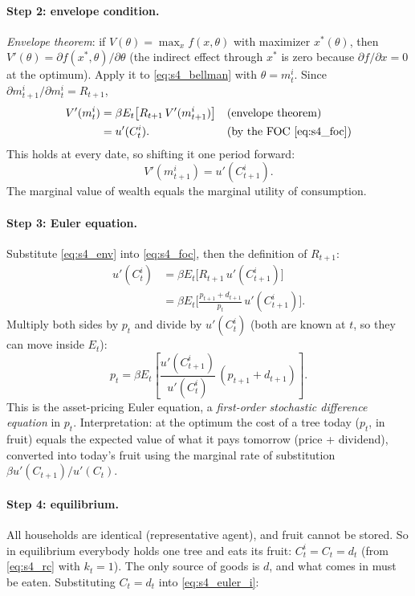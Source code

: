 \paragraph{Step 2: envelope condition.}
\emph{Envelope theorem}: if $V(\theta)=\max_x f(x,\theta)$ with maximizer $x^*(\theta)$, then $V'(\theta) = \partial f(x^*,\theta)/\partial\theta$ (the indirect effect through $x^*$ is zero because $\partial f/\partial x=0$ at the optimum).
Apply it to \eqref{eq:s4_bellman} with $\theta = m^i_t$. Since $\partial m^i_{t+1}/\partial m^i_t = R_{t+1}$,
\begin{align*}
  V'(m^i_t) &= \beta E_t\big[R_{t+1}\,V'(m^i_{t+1})\big] && \text{(envelope theorem)}\\
            &= u'(C^i_t). && \text{(by the FOC \eqref{eq:s4_foc})}
\end{align*}
This holds at every date, so shifting it one period forward:
\begin{equation}\label{eq:s4_env}
  V'(m^i_{t+1}) = u'(C^i_{t+1}).
\end{equation}
The marginal value of wealth equals the marginal utility of consumption.

\paragraph{Step 3: Euler equation.}
Substitute \eqref{eq:s4_env} into \eqref{eq:s4_foc}, then the definition of $R_{t+1}$:
\begin{align*}
  u'(C^i_t) &= \beta E_t\big[R_{t+1}\,u'(C^i_{t+1})\big]\\
  &= \beta E_t\Big[\frac{p_{t+1}+d_{t+1}}{p_t}\,u'(C^i_{t+1})\Big].
\end{align*}
Multiply both sides by $p_t$ and divide by $u'(C^i_t)$ (both are known at $t$, so they can move inside $E_t$):
\begin{equation}\label{eq:s4_euler_i}
  p_t = \beta E_t\!\left[\frac{u'(C^i_{t+1})}{u'(C^i_t)}\,(p_{t+1}+d_{t+1})\right].
\end{equation}
This is the asset-pricing Euler equation, a \emph{first-order stochastic difference equation} in $p_t$. Interpretation: at the optimum the cost of a tree today ($p_t$, in fruit) equals the expected value of what it pays tomorrow (price + dividend), converted into today's fruit using the marginal rate of substitution $\beta u'(C_{t+1})/u'(C_t)$.

\paragraph{Step 4: equilibrium.}
All households are identical (representative agent), and fruit cannot be stored. So in equilibrium everybody holds one tree and eats its fruit: $C^i_t = C_t = d_t$ (from \eqref{eq:s4_rc} with $k_t=1$). The only source of goods is $d$, and what comes in must be eaten. Substituting $C_t=d_t$ into \eqref{eq:s4_euler_i}:

